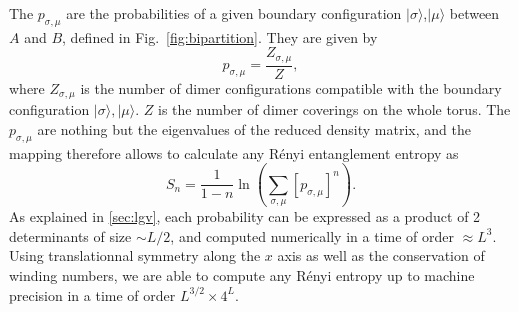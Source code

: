 \documentclass[11pt]{iopart}
\newcommand{\psm}{p_{\sigma,\mu}}
\begin{document}
The $p_{\sigma,\mu}$ are the probabilities of a given boundary configuration $|\sigma\rangle$,$|\mu\rangle$ between $A$ and $B$, defined in Fig.~\ref{fig:bipartition}. They are given by
\begin{equation}
 \psm=\frac{Z_{\sigma,\mu}}{Z},
\end{equation}
where $Z_{\sigma,\mu}$ is the number of dimer configurations compatible with the boundary configuration $|\sigma\rangle,|\mu\rangle$. $Z$ is the number of dimer coverings on the whole torus. The $\psm$ are nothing but the eigenvalues of the reduced density matrix, and the mapping therefore allows to calculate  any R\'enyi entanglement entropy as
\begin{equation}
 S_n=\frac{1}{1-n}\ln \left(\sum_{\sigma,\mu}[\psm]^n\right).
\end{equation}
As explained in \ref{sec:lgv}, each probability can be expressed as a product of 2 determinants of size $\sim L/2$, and computed numerically in a time of order $\approx L^3$. Using translationnal symmetry along the $x$ axis as well as the conservation of winding numbers, we are able to compute any R\'enyi entropy up to machine precision in a time of order $L^{3/2}\times 4^L$.
\end{document}
